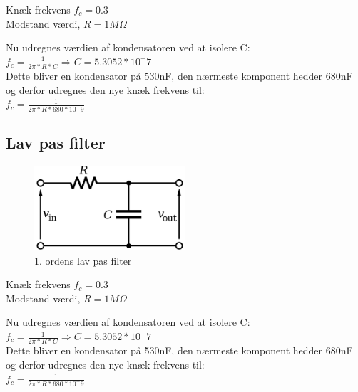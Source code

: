 Knæk frekvens $f_c = 0.3$ \\
Modstand værdi, $R = 1M\Omega$

Nu udregnes værdien af kondensatoren ved at isolere C: \\
$f_c = \frac{1}{2\pi * R * C} \Rightarrow C = 5.3052 * 10^-7$ \\

Dette bliver en kondensator på 530nF, den nærmeste komponent hedder 680nF og derfor udregnes den nye knæk frekvens til:  \\
$ f_c = \frac{1}{2\pi * R * 680 * 10^-9} $


\subsection{Lav pas filter}
\begin{figure}[H]
	\centering
	\includegraphics[width = 0.5\textwidth]{billeder/LowPass.png}
	\caption{1. ordens lav pas filter}\label{fig:lowpass}
\end{figure}
Knæk frekvens $f_c = 0.3$ \\
Modstand værdi, $R = 1M\Omega$

Nu udregnes værdien af kondensatoren ved at isolere C: \\
$f_c = \frac{1}{2\pi * R * C} \Rightarrow C = 5.3052 * 10^-7$ \\

Dette bliver en kondensator på 530nF, den nærmeste komponent hedder 680nF og derfor udregnes den nye knæk frekvens til:  \\
$ f_c = \frac{1}{2\pi * R * 680 * 10^-9} $

\newpage
